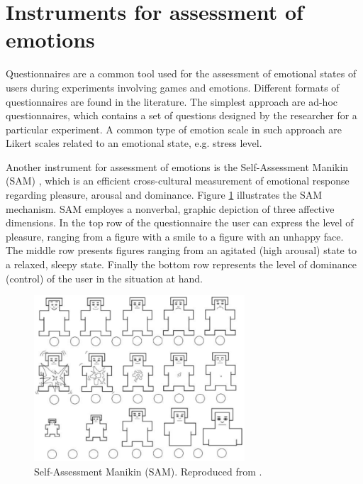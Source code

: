 
\section{Instruments for assessment of emotions}

Questionnaires are a common tool used for the assessment of emotional states of users during experiments involving games and emotions. Different formats of questionnaires are found in the literature. The simplest approach are ad-hoc questionnaires, which contains a set of questions designed by the researcher for a particular experiment. A common type of emotion scale in such approach are Likert scales related to an emotional state, e.g. stress level.

Another instrument for assessment of emotions is the Self-Assessment Manikin (SAM) \parencite{morris1995observations}, which is an efficient cross-cultural measurement of emotional response regarding pleasure, arousal and dominance. Figure \ref{fig:sam} illustrates the SAM mechanism. SAM employes a nonverbal, graphic depiction of three affective dimensions. In the top row of the questionnaire the user can express the level of pleasure, ranging from a figure with a smile to a figure with an unhappy face. The middle row presents figures ranging from an agitated (high arousal) state to a relaxed, sleepy state. Finally the bottom row represents the level of dominance (control) of the user in the situation at hand.

\begin{figure}[h]
    \centering
    \includegraphics[width=0.7\textwidth]{figures/SAM.png}
    \caption{Self-Assessment Manikin (SAM). Reproduced from \textcite{morris1995observations}.}
    \label{fig:sam}
\end{figure}

